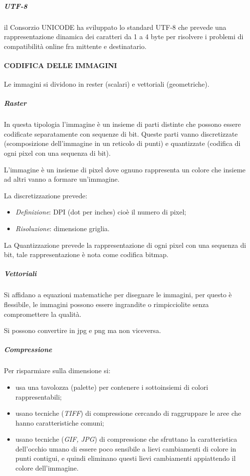 \subparagraph{\texorpdfstring{\emph{UTF-8}}{UTF-8}}\label{utf-8}

il Consorzio UNICODE ha sviluppato lo standard UTF-8 che prevede una
rappresentazione dinamica dei caratteri da 1 a 4 byte per risolvere i
problemi di compatibilità online fra mittente e destinatario.

\paragraph{CODIFICA DELLE IMMAGINI}\label{codifica-delle-immagini}

Le immagini si dividono in rester (scalari) e vettoriali (geometriche).

\subparagraph{\texorpdfstring{\emph{Raster}}{Raster}}\label{raster}

In questa tipologia l'immagine è un insieme di parti distinte che
possono essere codificate separatamente con sequenze di bit. Queste
parti vanno discretizzate (scomposizione dell'immagine in un reticolo di
punti) e quantizzate (codifica di ogni pixel con una sequenza di bit).

L'immagine è un insieme di pixel dove ognuno rappresenta un colore che
insieme ad altri vanno a formare un'immagine.

La discretizzazione prevede:

\begin{itemize}
\item
  \emph{Definizione}: DPI (dot per inches) cioè il numero di pixel;
\item
  \emph{Risoluzione}: dimensione griglia.
\end{itemize}

La Quantizzazione prevede la rappresentazione di ogni pixel con una
sequenza di bit, tale rappresentazione è nota come codifica bitmap.

\subparagraph{\texorpdfstring{\emph{Vettoriali}}{Vettoriali}}\label{vettoriali}

Si affidano a equazioni matematiche per disegnare le immagini, per
questo è flessibile, le immagini possono essere ingrandite o
rimpicciolite senza compromettere la qualità.

Si possono convertire in jpg e png ma non viceversa.

\subparagraph{\texorpdfstring{\emph{Compressione}}{Compressione}}\label{compressione}

Per risparmiare sulla dimensione si:

\begin{itemize}
\item
  usa una tavolozza (palette) per contenere i sottoinsiemi di colori
  rappresentabili;
\item
  usano tecniche (\emph{TIFF}) di compressione cercando di raggruppare
  le aree che hanno caratteristiche comuni;
\item
  usano tecniche (\emph{GIF, JPG}) di compressione che sfruttano la
  caratteristica dell'occhio umano di essere poco sensibile a lievi
  cambiamenti di colore in punti contigui, e quindi eliminano questi
  lievi cambiamenti appiattendo il colore dell'immagine.
\end{itemize}

